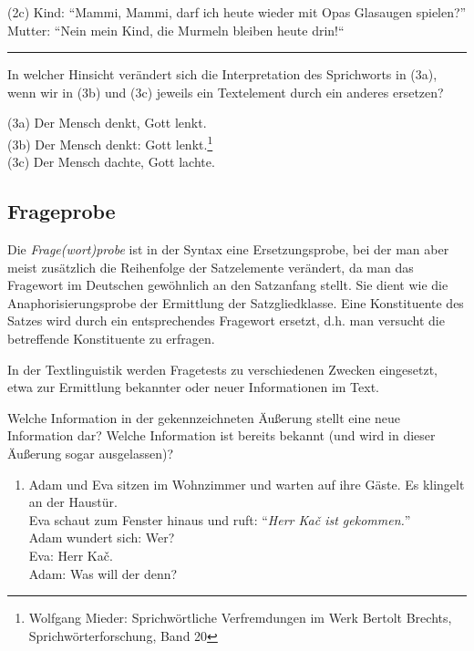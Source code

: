 \documentclass[
  letterpaper,
]{scrbook}
\providecommand{\tightlist}{%
  \setlength{\itemsep}{0pt}\setlength{\parskip}{0pt}}\usepackage{longtable,booktabs,array}
\begin{document}
(2c) Kind: ``Mammi, Mammi, darf ich heute wieder mit Opas Glasaugen
spielen?''\\
Mutter: ``Nein mein Kind, die Murmeln bleiben heute drin!{}``\\

\begin{center}\rule{0.5\linewidth}{0.5pt}\end{center}

In welcher Hinsicht verändert sich die Interpretation des Sprichworts in
(3a), wenn wir in (3b) und (3c) jeweils ein Textelement durch ein
anderes ersetzen?

(3a) Der Mensch denkt, Gott lenkt.\\
(3b) Der Mensch denkt: Gott lenkt.\footnote{Wolfgang Mieder:
  Sprichwörtliche Verfremdungen im Werk Bertolt Brechts,
  Sprichwörterforschung, Band 20}\\
(3c) Der Mensch dachte, Gott lachte.\\

\hypertarget{frageprobe}{%
\subsection{Frageprobe}\label{frageprobe}}

Die \emph{Frage(wort)probe} ist in der Syntax eine Ersetzungsprobe, bei
der man aber meist zusätzlich die Reihenfolge der Satzelemente
verändert, da man das Fragewort im Deutschen gewöhnlich an den
Satzanfang stellt. Sie dient wie die Anaphorisierungsprobe der
Ermittlung der Satzgliedklasse. Eine Konstituente des Satzes wird durch
ein entsprechendes Fragewort ersetzt, d.h. man versucht die betreffende
Konstituente zu erfragen.

In der Textlinguistik werden Fragetests zu verschiedenen Zwecken
eingesetzt, etwa zur Ermittlung bekannter oder neuer Informationen im
Text.

Welche Information in der gekennzeichneten Äußerung stellt eine neue
Information dar? Welche Information ist bereits bekannt (und wird in
dieser Äußerung sogar ausgelassen)?\\

\begin{enumerate}
\def\labelenumi{(\arabic{enumi})}
\setcounter{enumi}{3}
\tightlist
\item
  Adam und Eva sitzen im Wohnzimmer und warten auf ihre Gäste. Es
  klingelt an der Haustür.\\
  Eva schaut zum Fenster hinaus und ruft: ``\emph{Herr Kač ist
  gekommen.}''\\
  Adam wundert sich: Wer?\\
  Eva: Herr Kač.\\
  Adam: Was will der denn?\\
\end{enumerate}
\end{document}
